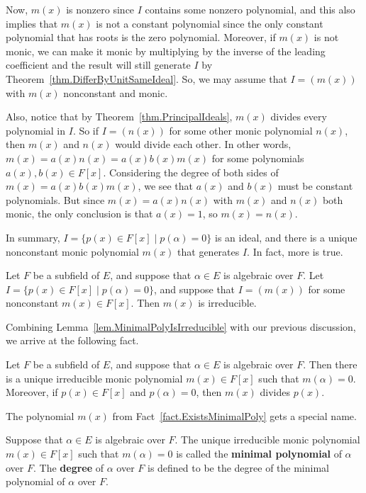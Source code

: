 Now, $m(x)$ is nonzero since $I$ contains some nonzero polynomial, and this also implies that $m(x)$ is not a constant polynomial since the only constant polynomial that has roots is the zero polynomial. Moreover, if $m(x)$ is not monic, we can make it monic by multiplying by the inverse of the leading coefficient and the result will still generate $I$ by Theorem~\ref{thm.DifferByUnitSameIdeal}. So, we may assume that $I = (m(x))$ with $m(x)$ nonconstant and monic. 

Also, notice that by Theorem~\ref{thm.PrincipalIdeals}, $m(x)$ divides every polynomial in $I$. So if $I = (n(x))$ for some other monic polynomial $n(x)$, then $m(x)$ and $n(x)$ would divide each other. In other words, $m(x) = a(x)n(x) = a(x)b(x)m(x)$ for some polynomials $a(x),b(x)\in F[x]$. Considering the degree of both sides of $m(x) = a(x)b(x)m(x)$, we see that $a(x)$ and $b(x)$ must be constant polynomials. But since $m(x) = a(x)n(x)$ with $m(x)$ and $n(x)$ both monic, the only conclusion is that $a(x) = 1$, so $m(x) = n(x)$. 

In summary, $I= \{p(x)\in F[x]\mid p(\alpha) = 0\}$ is an ideal, and there is a unique nonconstant monic polynomial $m(x)$ that generates $I$. In fact, more is true. 

\begin{lemma}\label{lem.MinimalPolyIsIrreducible}
Let $F$ be a subfield of $E$, and suppose that $\alpha\in E$ is algebraic over $F$. Let $I = \{p(x)\in F[x]\mid p(\alpha) = 0\}$, and suppose that $I = (m(x))$ for some nonconstant $m(x) \in F[x]$. Then $m(x)$ is irreducible.
\end{lemma}

Combining Lemma~\ref{lem.MinimalPolyIsIrreducible} with our previous discussion, we arrive at the following fact.

\begin{fact}\label{fact.ExistsMinimalPoly}
Let $F$ be a subfield of $E$, and suppose that $\alpha\in E$ is algebraic over $F$. Then there is a unique irreducible monic polynomial $m(x) \in F[x]$ such that $m(\alpha) = 0$. Moreover, if $p(x) \in F[x]$ and $p(\alpha) = 0$, then $m(x)$ divides $p(x)$.
\end{fact}

The polynomial $m(x)$ from  Fact~\ref{fact.ExistsMinimalPoly} gets a special name.

\begin{definition}
Suppose that $\alpha\in E$ is algebraic over $F$. The unique irreducible monic polynomial $m(x) \in F[x]$ such that $m(\alpha) = 0$ is called the \textbf{minimal polynomial} of $\alpha$ over $F$. The \textbf{degree} of $\alpha$ over $F$ is defined to be the degree of the minimal polynomial of $\alpha$ over $F$. 
\end{definition}


